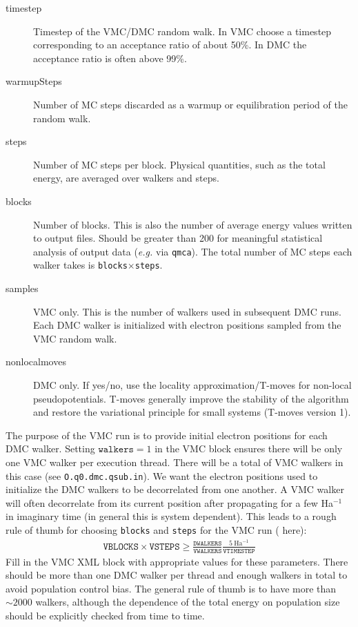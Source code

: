 \begin{description}
  \item[timestep] Timestep of the VMC/DMC random walk.  In VMC choose a timestep corresponding to an acceptance ratio of about 50\%.  In DMC the acceptance ratio is often above 99\%.
  \item[warmupSteps]  Number of MC steps discarded as a warmup or equilibration period of the random walk.  
  \item[steps] Number of MC steps per block.  Physical quantities, such as the total energy, are averaged over walkers and steps.
  \item[blocks]  Number of blocks.  This is also the number of average energy values written to output files.  Should be greater than 200 for meaningful statistical analysis of output data (\emph{e.g.} via \texttt{qmca}).  The total number of MC steps each walker takes is \texttt{blocks}$\times$\texttt{steps}.
  \item[samples] VMC only. This is the number of walkers used in subsequent DMC runs.  Each DMC walker is initialized with electron positions sampled from the VMC random walk.
  \item[nonlocalmoves] DMC only.  If yes/no, use the locality approximation/T-moves for non-local pseudopotentials.  T-moves generally improve the stability of the algorithm and restore the variational principle for small systems (T-moves version 1).
\end{description}

The purpose of the VMC run is to provide initial electron positions for each DMC walker.  Setting $\texttt{walkers}=1$ in the VMC block ensures there will be only one VMC walker per execution thread.  There will be a total of  VMC walkers in this case (see \texttt{O.q0.dmc.qsub.in}).  We want the electron positions used to initialize the DMC walkers to be decorrelated from one another.  A VMC walker will often decorrelate from its current position after propagating for a few Ha$^{-1}$ in imaginary time (in general this is system dependent).  This leads to a rough rule of thumb for choosing \texttt{blocks} and \texttt{steps} for the VMC run ( here):
\begin{align}
  \texttt{VBLOCKS}\times\texttt{VSTEPS} \ge \frac{\texttt{DWALKERS}}{\texttt{VWALKERS}} \frac{5~\textrm{Ha}^{-1}}{\texttt{VTIMESTEP}}
\end{align}
Fill in the VMC XML block with appropriate values for these parameters.  There should be more than one DMC walker per thread and enough walkers in total to avoid population control bias.  The general rule of thumb is to have more than $\sim 2000$ walkers, although the dependence of the total energy on population size should be explicitly checked from time to time.


